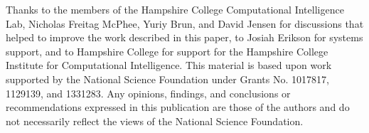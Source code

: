 \documentclass{sig-alternate}
\begin{document}
Thanks to the members of the Hampshire College Computational Intelligence Lab, Nicholas Freitag McPhee, Yuriy Brun, and David Jensen for discussions that helped to improve the work described in this paper, to Josiah Erikson for systems support, and to Hampshire College for support for the Hampshire College Institute for Computational Intelligence. This material is based upon work supported by the National Science Foundation under Grants No. 1017817, 1129139, and 1331283. Any opinions, findings, and conclusions or recommendations expressed in this publication are those of the authors and do not necessarily reflect the views of the National Science Foundation.


%

%
%
\end{document}
